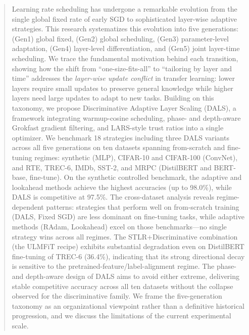 \documentclass[a4paper,fleqn]{cas-dc}
\begin{document}
\begin{abstract}
Learning rate scheduling has undergone a remarkable evolution from the single global fixed rate of early SGD to sophisticated layer-wise adaptive strategies. This research systematizes this evolution into five generations: (Gen1) global fixed, (Gen2) global scheduling, (Gen3) parameter-level adaptation, (Gen4) layer-level differentiation, and (Gen5) joint layer-time scheduling. We trace the fundamental motivation behind each transition, showing how the shift from ``one-size-fits-all'' to ``tailoring by layer and time'' addresses the \emph{layer-wise update conflict} in transfer learning: lower layers require small updates to preserve general knowledge while higher layers need large updates to adapt to new tasks. Building on this taxonomy, we propose Discriminative Adaptive Layer Scaling (DALS), a framework integrating warmup-cosine scheduling, phase- and depth-aware Grokfast gradient filtering, and LARS-style trust ratios into a single optimizer. We benchmark 18 strategies including three DALS variants across all five generations on ten datasets spanning from-scratch and fine-tuning regimes: synthetic (MLP), CIFAR-10 and CIFAR-100 (ConvNet), and RTE, TREC-6, IMDb, SST-2, and MRPC (DistilBERT and BERT-base, fine-tune). On the synthetic controlled benchmark, the adaptive and lookahead methods achieve the highest accuracies (up to 98.0\%), while DALS is competitive at 97.5\%. The cross-dataset analysis reveals regime-dependent patterns: strategies that perform well on from-scratch training (DALS, Fixed SGD) are less dominant on fine-tuning tasks, while adaptive methods (RAdam, Lookahead) excel on those benchmarks---no single strategy wins across all regimes. The STLR+Discriminative combination (the ULMFiT recipe) exhibits substantial degradation even on DistilBERT fine-tuning of TREC-6 (36.4\%), indicating that its strong directional decay is sensitive to the pretrained-feature/label-alignment regime. The phase- and depth-aware design of DALS aims to avoid either extreme, delivering stable competitive accuracy across all ten datasets without the collapse observed for the discriminative family. We frame the five-generation taxonomy as an organizational viewpoint rather than a definitive historical progression, and we discuss the limitations of the current experimental scale.
\end{abstract}
\end{document}
